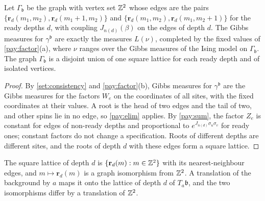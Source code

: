 \begin{corollary}\label{pay:effective}
Let $\Gamma_{\mathfrak b}$ be the graph with vertex set $\mathbb{Z}^2$ whose edges are the pairs $\{\mathbf r_d(m_1,m_2),\mathbf r_d(m_1+1,m_2)\}$ and $\{\mathbf r_d(m_1,m_2),\mathbf r_d(m_1,m_2+1)\}$ for the ready depths $d$, with coupling $J_{n(d)}(\beta)$ on the edges of depth $d$. The Gibbs measures for $\gamma^{\mathfrak b}$ are exactly the measures $L(\nu)$, completed by the fixed values of \cref{pay:factor}(a), where $\nu$ ranges over the Gibbs measures of the Ising model on $\Gamma_{\mathfrak b}$. The graph $\Gamma_{\mathfrak b}$ is a disjoint union of one square lattice for each ready depth and of isolated vertices.
\end{corollary}

\begin{proof}
By \cref{set:consistency} and \cref{pay:factor}(b), Gibbs measures for $\gamma^{\mathfrak b}$ are the Gibbs measures for the factors $W_e$ on the coordinates of all sites, with the fixed coordinates at their values. A root is the head of two edges and the tail of two, and other spins lie in no edge, so \cref{pay:elim} applies. By \cref{pay:sum}, the factor $Z_e$ is constant for edges of non-ready depths and proportional to $e^{J_{n(d)}\sigma_u\sigma_v}$ for ready ones; constant factors do not change a specification. Roots of different depths are different sites, and the roots of depth $d$ with these edges form a square lattice.
\end{proof}

The square lattice of depth $d$ is $\{\mathbf r_d(m):m\in\mathbb{Z}^2\}$ with its nearest-neighbour edges, and $m\mapsto\mathbf r_d(m)$ is a graph isomorphism from $\mathbb{Z}^2$. A translation of the background by $a$ maps it onto the lattice of depth $d$ of $T_a\mathfrak b$, and the two isomorphisms differ by a translation of $\mathbb{Z}^2$.
